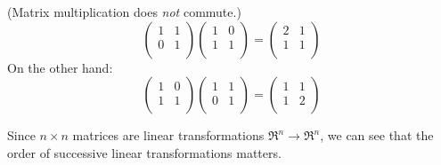 \begin{example} (Matrix multiplication does \emph{not} commute.)
\[
\begin{pmatrix}
1 & 1 \\
0 & 1 \\
\end{pmatrix}
\begin{pmatrix}
1 & 0 \\
1 & 1 \\
\end{pmatrix} =
\begin{pmatrix}
2 & 1 \\
1 & 1 \\
\end{pmatrix}
\]
On the other hand:
\[
\begin{pmatrix}
1 & 0 \\
1 & 1 \\
\end{pmatrix}
\begin{pmatrix}
1 & 1 \\
0 & 1 \\
\end{pmatrix} =
\begin{pmatrix}
1 & 1 \\
1 & 2 \\
\end{pmatrix}
\]
\end{example}
Since $n\times n$ matrices are linear transformations $\Re^n \rightarrow \Re^n$, we can see that the order of successive linear transformations matters.  

